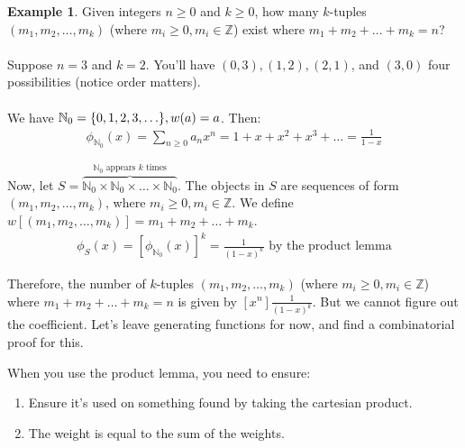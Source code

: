 \documentclass[]{article}
\theoremstyle{definition}
\newtheorem{ex}{Example}[section]
\DeclarePairedDelimiter{\set}{\lbrace}{\rbrace}
\begin{document}
				\begin{ex}
					Given integers $n \ge 0$ and $k \ge 0$, how many $k$-tuples $(m_1, m_2, \ldots, m_k)$ (where $m_i \ge 0, m_i \in \mathbb{Z}$) exist where $m_1 + m_2 + \ldots + m_k = n$?
					\\ \\
					Suppose $n = 3$ and $k = 2$. You'll have $(0, 3), (1, 2), (2, 1)$, and $(3, 0)$ \textendash{} four possibilities (notice order matters).
					\\ \\
					We have $\mathbb{N}_0 = \set{0, 1, 2, 3, \ldots }, w(a) = a$. Then:
					\begin{align*}
						\phi_{\mathbb{N}_0}(x) = \sum_{n \ge 0} a_n x^n = 1 + x + x^2 + x^3 + \ldots = \frac{1}{1-x}
					\end{align*}

					Now, let $S = \overbrace{\mathbb{N}_0 \times \mathbb{N}_0 \times \ldots \times \mathbb{N}_0}^{\mathbb{N}_0 \text{ appears } k \text{ times}}$. The objects in $S$ are sequences of form $(m_1, m_2, \ldots, m_k)$, where $m_i \ge 0, m_i \in \mathbb{Z}$. We define $w[(m_1, m_2, \ldots, m_k)] = m_1 + m_2 + \ldots + m_k$.
					\begin{align*}
						\phi_S(x) = [\phi_{\mathbb{N}_0}(x)]^k = \frac{1}{(1-x)^k} \text{ by the product lemma}
					\end{align*}

					Therefore, the number of $k$-tuples $(m_1, m_2, \ldots, m_k)$ (where $m_i \ge 0, m_i \in \mathbb{Z}$) where $m_1 + m_2 + \ldots + m_k = n$ is given by $[x^n]\frac{1}{(1 - x)^k}$. But we cannot figure out the coefficient. Let's leave generating functions for now, and find a combinatorial proof for this.
				\end{ex}

				When you use the product lemma, you need to ensure:
				\begin{enumerate}
					\item Ensure it's used on something found by taking the cartesian product.
					\item The weight is equal to the sum of the weights.
				\end{enumerate}
				
\end{document}
